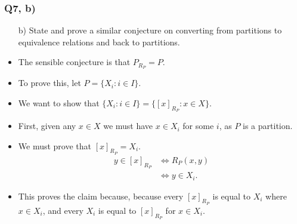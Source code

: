 \documentclass[handout]{beamer}
\begin{document}
\begin{frame}
\frametitle{Q7, b)}
\begin{enumerate}
\item[b)] State and prove a similar conjecture on converting from partitions to equivalence relations and back to partitions.
\end{enumerate}
\begin{itemize}
\item The sensible conjecture is that $P_{R_P} = P$. 
\item To prove this, let $P = \{X_i:i\in I\}$. 
\item We want to show that $\{X_i:i\in I\} = \{[x]_{R_P}: x\in X\}$. 
\item First, given any $x\in X$ we must have $x\in X_i$ for some $i$, as $P$ is a partition. 
\item We must prove that $[x]_{R_P} = X_i$. 
\begin{align*}y\in [x]_{R_P} &\iff R_P(x,y) \\
&\iff y\in X_i. 
\end{align*}
\item This proves the claim because, because every $[x]_{R_P}$ is equal to $X_i$ where $x\in X_i$, and every $X_i$ is equal to $[x]_{R_P}$ for $x\in X_i$.  
\end{itemize}
\end{frame}
\end{document}
